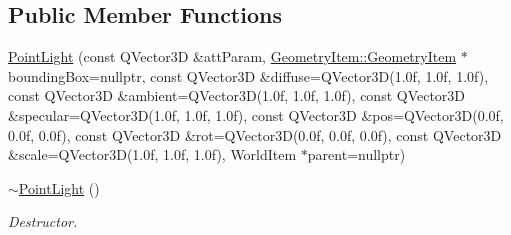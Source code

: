 \subsection*{Public Member Functions}
\begin{DoxyCompactItemize}
\item 
\mbox{\hyperlink{class_geometry_engine_1_1_geometry_world_item_1_1_geometry_light_1_1_point_light_aa9029eea56c5719db5ade7aad253f106}{Point\+Light}} (const Q\+Vector3D \&att\+Param, \mbox{\hyperlink{class_geometry_engine_1_1_geometry_world_item_1_1_geometry_item_1_1_geometry_item}{Geometry\+Item\+::\+Geometry\+Item}} $\ast$bounding\+Box=nullptr, const Q\+Vector3D \&diffuse=Q\+Vector3D(1.\+0f, 1.\+0f, 1.\+0f), const Q\+Vector3\+D \&ambient=\+Q\+Vector3\+D(1.\+0f, 1.\+0f, 1.\+0f), const Q\+Vector3\+D \&specular=\+Q\+Vector3\+D(1.\+0f, 1.\+0f, 1.\+0f), const Q\+Vector3\+D \&pos=\+Q\+Vector3\+D(0.\+0f, 0.\+0f, 0.\+0f), const Q\+Vector3\+D \&rot=\+Q\+Vector3\+D(0.\+0f, 0.\+0f, 0.\+0f), const Q\+Vector3\+D \&scale=\+Q\+Vector3\+D(1.\+0f, 1.\+0f, 1.\+0f), World\+Item $\ast$parent=nullptr)
\item 
\mbox{\label{class_geometry_engine_1_1_geometry_world_item_1_1_geometry_light_1_1_point_light_a36e386c17ee8ddd000b5d85e5b8b3bfb}} 
\mbox{\hyperlink{class_geometry_engine_1_1_geometry_world_item_1_1_geometry_light_1_1_point_light_a36e386c17ee8ddd000b5d85e5b8b3bfb}{$\sim$\+Point\+Light}} ()
\begin{DoxyCompactList}\small\item\em Destructor. \end{DoxyCompactList}\end{DoxyCompactItemize}
